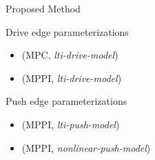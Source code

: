 \begin{frame}[fragile]{Proposed Method} 
\begin{block}{Drive edge parameterizations}
    \begin{itemize}
      \item (MPC, \textit{lti-drive-model})
      \item (MPPI, \textit{lti-drive-model})
        \end{itemize}
  \end{block}\pause
\begin{block}{Push edge parameterizations}
    \begin{itemize}
      \item (MPPI, \textit{lti-push-model})
      \item (MPPI, \textit{nonlinear-push-model})
        \end{itemize}
  \end{block}
\end{frame}

